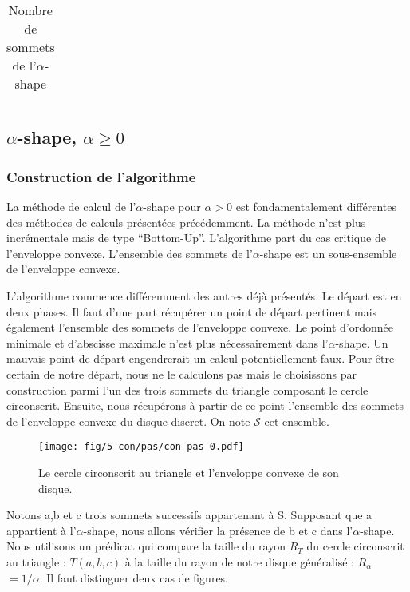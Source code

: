 \begin{table}[H]
\begin{tabular}{|p{0.09\linewidth}|p{0.13\linewidth}||p{0.23\linewidth}||p{0.23\linewidth}|p{0.23\linewidth}|}
    \hline
  \end{tabular} 
  \caption{Nombre de sommets de l'$\alpha$-shape}
\end{table}

\subsection{$\alpha$-shape, $\alpha \geq 0$}

\subsubsection{Construction de l'algorithme}

La méthode de calcul de l'$\alpha$-shape pour $\alpha > 0$ est fondamentalement différentes des méthodes de calculs présentées précédemment. La méthode n'est plus incrémentale mais de type ``Bottom-Up''. L'algorithme part du cas critique de l'enveloppe convexe. L'ensemble des sommets de l'$\alpha$-shape est un sous-ensemble de l'enveloppe convexe. 

L'algorithme commence différemment des autres déjà présentés. Le départ est en deux phases. Il faut d'une part récupérer un point de départ pertinent mais également l'ensemble des sommets de l'enveloppe convexe. Le point d'ordonnée minimale et d'abscisse maximale n'est plus nécessairement dans l'$\alpha$-shape. Un mauvais point de départ engendrerait un calcul potentiellement faux. Pour être certain de notre départ, nous ne le calculons pas mais le choisissons par construction parmi l'un des trois sommets du triangle composant le cercle circonscrit. Ensuite, nous récupérons à partir de ce point l'ensemble des sommets de l'enveloppe convexe du disque discret. On note $\mathcal{S}$ cet ensemble.

\begin{figure}[H]
  \centering
  \texttt{[image: fig/5-con/pas/con-pas-0.pdf]}
  \caption{Le cercle circonscrit au triangle et l'enveloppe convexe de son disque.}
\end{figure}


Notons a,b et c trois sommets successifs appartenant à S. Supposant que a appartient à l'$\alpha$-shape, nous allons vérifier la présence de b et c dans l'$\alpha$-shape. Nous utilisons un prédicat qui compare la taille du rayon \textbf{$R_T$} du cercle circonscrit au triangle : $T(a, b, c)$ à la taille du rayon de notre disque généralisé : \textbf{$R_{\alpha}$} $= 1/\alpha$. Il faut distinguer deux cas de figures.\\


